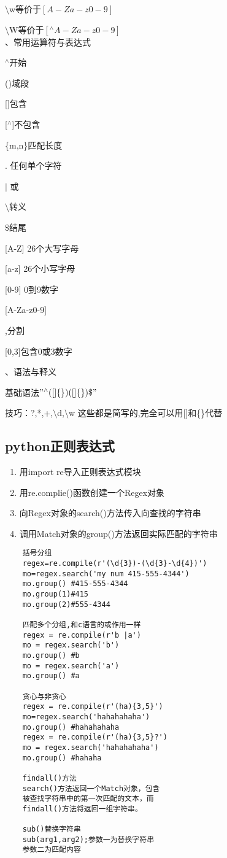 \documentclass[twocolumn]{article}
\begin{document}
	$\setminus$w等价于$[A-Za-z0-9]$
	
	$\setminus$W等价于$[^\land A-Za-z0-9]$
	\\
	
	、常用运算符与表达式
	
	$^\land$开始
	
	()域段
	
	[\quad]包含
	
	[$^\land$\quad]不包含
	
	\{m,n\}匹配长度
	
	$.$ 任何单个字符
	
	$|$ 或
	
	$\setminus$转义
	
	$\$$结尾
	
	[A-Z] 26个大写字母
	
	[a-z] 26个小写字母
	
	[0-9] 0到9数字
	
	[A-Za-z0-9] 
	
	,分割
	
	[0,3]包含0或3数字
	
	、语法与释义
	
	基础语法$ "^\land([]\{\})([]\{\})\$"$
	
	技巧：?,*,+,$\setminus$d,$\setminus$w 这些都是简写的,完全可以用[]和\{\}代替
	
	\subsection{python正则表达式}
	\begin{enumerate}
		\item 用import re导入正则表达式模块
		\item 用re.complie()函数创建一个Regex对象
		\item 向Regex对象的search()方法传入向查找的字符串
		\item 调用Match对象的group()方法返回实际匹配的字符串
	\end{enumerate}
	\begin{lstlisting}
	括号分组
	regex=re.compile(r'(\d{3})-(\d{3}-\d{4})')
	mo=regex.search('my num 415-555-4344')
	mo.group() #415-555-4344
	mo.group(1)#415
	mo.group(2)#555-4344
	
	匹配多个分组,和c语言的或作用一样
	regex = re.compile(r'b |a')
	mo = regex.search('b')
	mo.group() #b
	mo = regex.search('a')
	mo.group() #a
	
	贪心与非贪心
	regex = re.compile(r'(ha){3,5}')
	mo=regex.search('hahahahaha')
	mo.group() #hahahahaha
	regex = re.compile(r'(ha){3,5}?')
	mo = regex.search('hahahahaha')
	mo.group() #hahaha
	
	findall()方法
	search()方法返回一个Match对象，包含
	被查找字符串中的第一次匹配的文本，而
	findall()方法将返回一组字符串。
	
	sub()替换字符串
	sub(arg1,arg2);参数一为替换字符串
	参数二为匹配内容
	
	\end{lstlisting}
	
\end{document}
